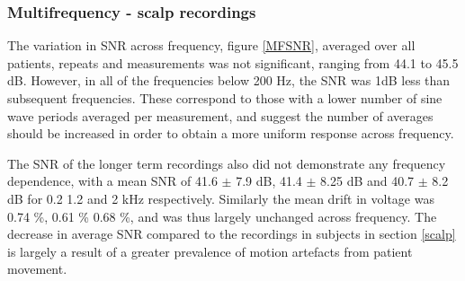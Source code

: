 \subsubsection{Multifrequency - scalp recordings}

The variation in SNR across frequency, figure \ref{MFSNR}, averaged over all patients, repeats and measurements was not significant, ranging from 44.1 to 45.5 dB.  However, in all of the frequencies below 200 Hz, the SNR was 1dB less than subsequent frequencies. These correspond to those with a lower number of sine wave periods averaged per measurement, and suggest the number of averages should be increased in order to obtain a more uniform response across frequency. 

The SNR of the longer term recordings also did not demonstrate any frequency dependence, with a mean SNR of 41.6 $\pm$ 7.9 dB, 41.4 $\pm$ 8.25 dB and 40.7 $\pm$ 8.2 dB for 0.2 1.2 and 2 kHz respectively. Similarly the mean drift in voltage was 0.74 \%, 0.61 \% 0.68 \%, and was thus largely unchanged across frequency. The decrease in average SNR compared to the recordings in subjects in section \ref{scalp} is largely a result of a greater prevalence of motion artefacts from patient movement. 